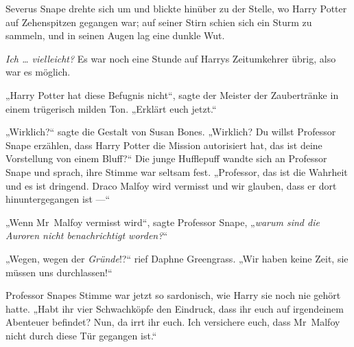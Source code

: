 Severus Snape drehte sich um und blickte hinüber zu der Stelle, wo Harry Potter auf Zehenspitzen gegangen war; auf seiner Stirn schien sich ein Sturm zu sammeln, und in seinen Augen lag eine dunkle Wut.

\emph{Ich … vielleicht?}
Es war noch eine Stunde auf Harrys Zeitumkehrer übrig, also war es möglich.

„Harry Potter hat diese Befugnis nicht“, sagte der Meister der Zaubertränke in einem trügerisch milden Ton.
„Erklärt euch jetzt.“

„Wirklich?“ sagte die Gestalt von Susan Bones.
„Wirklich? Du willst Professor Snape erzählen, dass Harry Potter die Mission autorisiert hat, das ist deine Vorstellung von einem Bluff?“ Die junge Hufflepuff wandte sich an Professor Snape und sprach, ihre Stimme war seltsam fest.
„Professor, das ist die Wahrheit und es ist dringend. Draco Malfoy wird vermisst und wir glauben, dass er dort hinuntergegangen ist —“

„Wenn Mr~Malfoy vermisst wird“, sagte Professor Snape,
„\emph{warum sind die Auroren nicht benachrichtigt worden?}“

„Wegen, wegen der \emph{Gründe}!?“ rief Daphne Greengrass.
„Wir haben keine Zeit, sie müssen uns durchlassen!“

Professor Snapes Stimme war jetzt so sardonisch, wie Harry sie noch nie gehört hatte.
„Habt ihr vier Schwachköpfe den Eindruck, dass ihr euch auf irgendeinem Abenteuer befindet? Nun, da irrt ihr euch. Ich versichere euch, dass Mr~Malfoy nicht durch diese Tür gegangen ist.“

